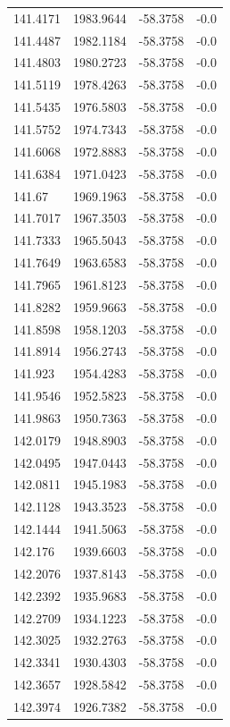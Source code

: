 \begin{table}[H]
\begin{tabular}{llll}
141.4171 & 1983.9644 & -58.3758 & -0.0 \\
141.4487 & 1982.1184 & -58.3758 & -0.0 \\
141.4803 & 1980.2723 & -58.3758 & -0.0 \\
141.5119 & 1978.4263 & -58.3758 & -0.0 \\
141.5435 & 1976.5803 & -58.3758 & -0.0 \\
141.5752 & 1974.7343 & -58.3758 & -0.0 \\
141.6068 & 1972.8883 & -58.3758 & -0.0 \\
141.6384 & 1971.0423 & -58.3758 & -0.0 \\
141.67 & 1969.1963 & -58.3758 & -0.0 \\
141.7017 & 1967.3503 & -58.3758 & -0.0 \\
141.7333 & 1965.5043 & -58.3758 & -0.0 \\
141.7649 & 1963.6583 & -58.3758 & -0.0 \\
141.7965 & 1961.8123 & -58.3758 & -0.0 \\
141.8282 & 1959.9663 & -58.3758 & -0.0 \\
141.8598 & 1958.1203 & -58.3758 & -0.0 \\
141.8914 & 1956.2743 & -58.3758 & -0.0 \\
141.923 & 1954.4283 & -58.3758 & -0.0 \\
141.9546 & 1952.5823 & -58.3758 & -0.0 \\
141.9863 & 1950.7363 & -58.3758 & -0.0 \\
142.0179 & 1948.8903 & -58.3758 & -0.0 \\
142.0495 & 1947.0443 & -58.3758 & -0.0 \\
142.0811 & 1945.1983 & -58.3758 & -0.0 \\
142.1128 & 1943.3523 & -58.3758 & -0.0 \\
142.1444 & 1941.5063 & -58.3758 & -0.0 \\
142.176 & 1939.6603 & -58.3758 & -0.0 \\
142.2076 & 1937.8143 & -58.3758 & -0.0 \\
142.2392 & 1935.9683 & -58.3758 & -0.0 \\
142.2709 & 1934.1223 & -58.3758 & -0.0 \\
142.3025 & 1932.2763 & -58.3758 & -0.0 \\
142.3341 & 1930.4303 & -58.3758 & -0.0 \\
142.3657 & 1928.5842 & -58.3758 & -0.0 \\
142.3974 & 1926.7382 & -58.3758 & -0.0 \\

\end{tabular}
\end{table}
